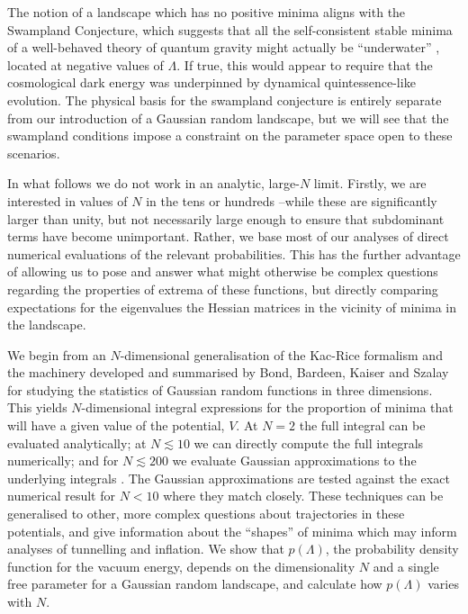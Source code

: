 \documentclass[12pt]{article}
\begin{document}
The notion of a landscape which has no positive minima aligns with the Swampland Conjecture, which suggests that all the self-consistent stable minima of a well-behaved theory of quantum gravity might actually be ``underwater'' \cite{Agrawal2018},  located at negative values of $\Lambda$. If true, this would appear to require that the cosmological dark energy was underpinned by dynamical quintessence-like evolution.  The physical basis for the swampland conjecture is entirely separate from our introduction of a Gaussian random landscape, but we will see that the swampland conditions impose a constraint on the parameter space open to these scenarios.  

In what follows we do not work in an analytic, large-$N$ limit. Firstly, we are interested in values of $N$ in the tens or hundreds --while these are significantly larger than unity, but not necessarily large enough to ensure that subdominant terms have become unimportant. Rather, we base most of our analyses of direct numerical evaluations of the relevant probabilities.  This has the further advantage of allowing us to pose and answer what might otherwise be complex questions regarding the properties of extrema of these functions, but directly comparing expectations for the eigenvalues the Hessian matrices in the vicinity of minima in the landscape. 
 
 We begin from an $N$-dimensional generalisation of the Kac-Rice formalism \cite{Kac1943,Rice1945} and the  machinery developed and summarised by Bond, Bardeen, Kaiser and Szalay  \cite{BBKS} for studying the statistics of Gaussian random functions in three dimensions. This yields $N$-dimensional integral expressions for the proportion of minima that will have a given value of the potential, $V$. At $N=2$ the full integral can be evaluated analytically; at $N \lesssim 10$ we can directly compute the full integrals numerically; and for $N \lesssim 200$ we evaluate Gaussian approximations to the underlying integrals . The Gaussian approximations are tested against the exact numerical result for $N <10$ where they match closely. These techniques can be generalised to other, more complex questions about trajectories in these potentials, and give information about the ``shapes'' of minima which may inform analyses of tunnelling and inflation. We show that $p(\Lambda)$, the probability density function for the vacuum energy, depends on the dimensionality $N$ and a single free parameter for a Gaussian random landscape, and calculate how $p(\Lambda)$ varies with $N$. 
 
\end{document}
